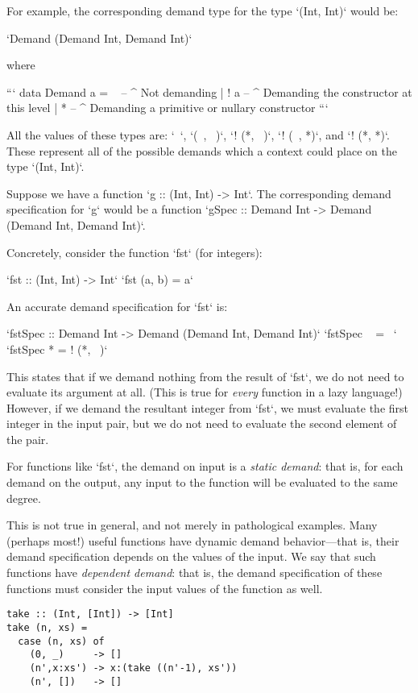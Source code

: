 \documentclass{article}
\begin{document}
For example, the corresponding demand type for the type `(Int, Int)` would be:

`Demand (Demand Int, Demand Int)`

where

```
data Demand a = ~   -- ^ Not demanding
              | ! a -- ^ Demanding the constructor at this level
              | *   -- ^ Demanding a primitive or nullary constructor
```

All the values of these types are: `~`, `(~, ~)`, `! (*, ~)`, `! (~,
*)`, and `! (*, *)`. These represent all of the possible demands which
a context could place on the type `(Int, Int)`.

Suppose we have a function `g :: (Int, Int) -> Int`. The corresponding
demand specification for `g` would be a function `gSpec :: Demand Int
-> Demand (Demand Int, Demand Int)`.

Concretely, consider the function `fst` (for integers):

`fst :: (Int, Int) -> Int`
`fst (a, b) = a`

An accurate demand specification for `fst` is:

`fstSpec :: Demand Int -> Demand (Demand Int, Demand Int)`
`fstSpec ~ = ~`
`fstSpec * = ! (*, ~)`

This states that if we demand nothing from the result of `fst`, we do
not need to evaluate its argument at all. (This is true for
\emph{every} function in a lazy language!) However, if we demand the
resultant integer from `fst`, we must evaluate the first integer in
the input pair, but we do not need to evaluate the second element of
the pair.

For functions like `fst`, the demand on input is a \emph{static
  demand}: that is, for each demand on the output, any input to the
function will be evaluated to the same degree.

This is not true in general, and not merely in pathological
examples. Many (perhaps most!) useful functions have dynamic demand
behavior---that is, their demand specification depends on the values
of the input. We say that such functions have \emph{dependent demand}:
that is, the demand specification of these functions must consider the
input values of the function as well.

\begin{verbatim}
take :: (Int, [Int]) -> [Int]
take (n, xs) =
  case (n, xs) of
    (0, _)     -> []
    (n',x:xs') -> x:(take ((n'-1), xs'))
    (n', [])   -> []
\end{verbatim}
\end{document}
